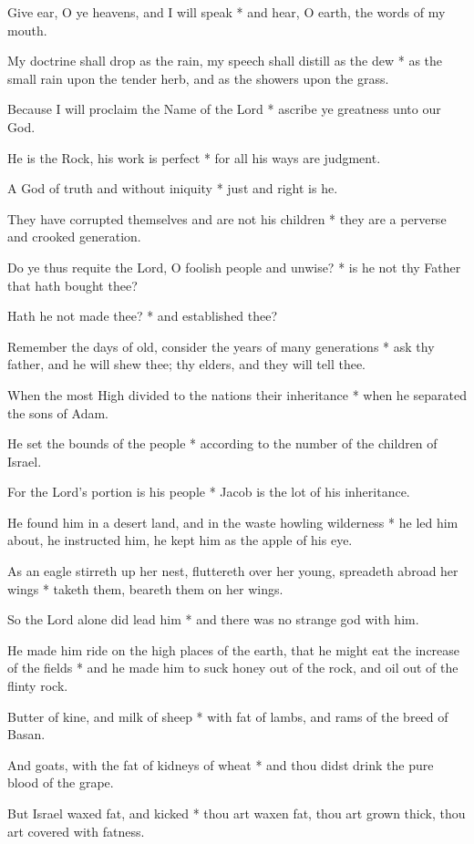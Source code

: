 Give ear, O ye heavens, and I will speak * and hear, O earth, the words of my mouth.

My doctrine shall drop as the rain, my speech shall distill as the dew * as the small rain upon the tender herb, and as the showers upon the grass.

Because I will proclaim the Name of the Lord * ascribe ye greatness unto our God.

He is the Rock, his work is perfect * for all his ways are judgment.

A God of truth and without iniquity * just and right is he.

They have corrupted themselves and are not his children * they are a perverse and crooked generation.

Do ye thus requite the Lord, O foolish people and unwise? * is he not thy Father that hath bought thee?

Hath he not made thee? * and established thee?

Remember the days of old, consider the years of many generations * ask thy father, and he will shew thee; thy elders, and they will tell thee.

When the most High divided to the nations their inheritance * when he separated the sons of Adam.

He set the bounds of the people * according to the number of the children of Israel.

For the Lord's portion is his people * Jacob is the lot of his inheritance.

He found him in a desert land, and in the waste howling wilderness * he led him about, he instructed him, he kept him as the apple of his eye.

As an eagle stirreth up her nest, fluttereth over her young, spreadeth abroad her wings * taketh them, beareth them on her wings.

So the Lord alone did lead him * and there was no strange god with him.

He made him ride on the high places of the earth, that he might eat the increase of the fields * and he made him to suck honey out of the rock, and oil out of the flinty rock.

Butter of kine, and milk of sheep * with fat of lambs, and rams of the breed of Basan.

And goats, with the fat of kidneys of wheat * and thou didst drink the pure blood of the grape.

But Israel waxed fat, and kicked * thou art waxen fat, thou art grown thick, thou art covered with fatness.

